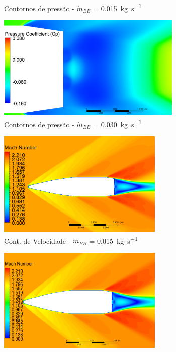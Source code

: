 \begin{figure}[!ht]
\begin{subfigure}[b]{0.47\textwidth}
        \caption{Contornos de pressão - \(\Dot{m}_{BB}\) = \qty{0,015}{\kilogram\per\second}}
        \label{fig:contorno-pressao-base-bb-1pol-vazao0015}
    \end{subfigure}
    \hfill
    \begin{subfigure}[b]{0.47\textwidth} %
        \centering
        \includegraphics[height=5cm,width=\textwidth]{coeficientepressao-vazao0030-temp2306-diam1pol.png}
        \caption{Contornos de pressão - \(\Dot{m}_{BB}\) = \qty{0,030}{\kilogram\per\second}}
        \label{fig:contorno-pressao-base-bb-1pol-vazao0030}
    \end{subfigure}
    \hfill
    \begin{subfigure}[b]{0.47\textwidth} %
        \centering
        \includegraphics[height=5cm,width=\textwidth]{contorno-velocidade-2306K-vazao-0015-1pol.png}
        \caption{Cont. de Velocidade - \(\Dot{m}_{BB}\) = \qty{0,015}{\kilogram\per\second}}
        \label{fig:contorno-velocidade-bb-1pol-vazao0015}
    \end{subfigure}
    \hfill
	\begin{subfigure}[b]{0.47\textwidth} %
        \centering
        \includegraphics[height=5cm,width=\textwidth]{contorno-velocidade-2306K-vazao-0030-1pol.png}

\end{subfigure}
\end{figure}
